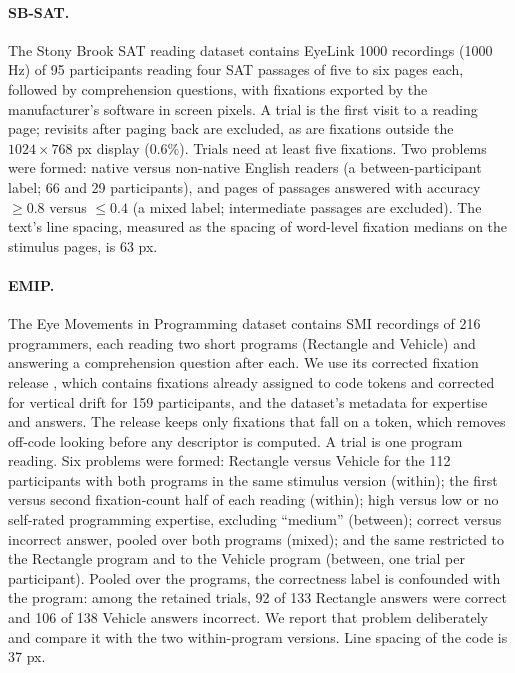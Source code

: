 \documentclass[11pt]{article}
\begin{document}
\paragraph{SB-SAT.} The Stony Brook SAT reading dataset \citep{ahn2020towards} contains EyeLink 1000 recordings (1000 Hz) of 95 participants reading four SAT passages of five to six pages each, followed by comprehension questions, with fixations exported by the manufacturer's software in screen pixels. A trial is the first visit to a reading page; revisits after paging back are excluded, as are fixations outside the $1024\times768$ px display (0.6\%). Trials need at least five fixations. Two problems were formed: native versus non-native English readers (a between-participant label; 66 and 29 participants), and pages of passages answered with accuracy $\geq 0.8$ versus $\leq 0.4$ (a mixed label; intermediate passages are excluded). The text's line spacing, measured as the spacing of word-level fixation medians on the stimulus pages, is 63 px.

\paragraph{EMIP.} The Eye Movements in Programming dataset \citep{bednarik2020emip} contains SMI recordings of 216 programmers, each reading two short programs (Rectangle and Vehicle) and answering a comprehension question after each. We use its corrected fixation release \citep{almadi2021emiptoolkit}, which contains fixations already assigned to code tokens and corrected for vertical drift for 159 participants, and the dataset's metadata for expertise and answers. The release keeps only fixations that fall on a token, which removes off-code looking before any descriptor is computed. A trial is one program reading. Six problems were formed: Rectangle versus Vehicle for the 112 participants with both programs in the same stimulus version (within); the first versus second fixation-count half of each reading (within); high versus low or no self-rated programming expertise, excluding ``medium'' (between); correct versus incorrect answer, pooled over both programs (mixed); and the same restricted to the Rectangle program and to the Vehicle program (between, one trial per participant). Pooled over the programs, the correctness label is confounded with the program: among the retained trials, 92 of 133 Rectangle answers were correct and 106 of 138 Vehicle answers incorrect. We report that problem deliberately and compare it with the two within-program versions. Line spacing of the code is 37 px.
\end{document}
